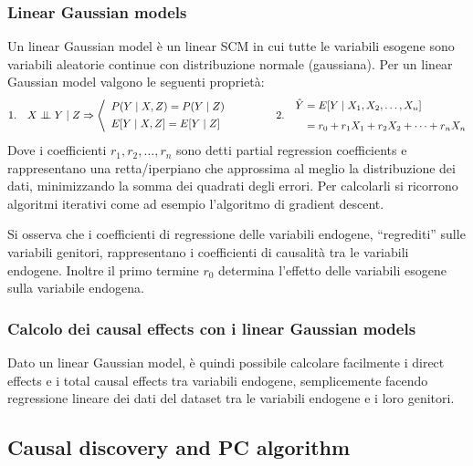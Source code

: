\subsubsection*{Linear Gaussian models}
Un linear Gaussian model è un linear SCM in cui tutte le variabili esogene sono variabili aleatorie continue con distribuzione
normale (gaussiana). Per un linear Gaussian model valgono le seguenti proprietà:
\[1. \quad X \perp \!\!\! \perp Y \mid Z  \Rightarrow \left< \begin{array}{l}
	P(Y \mid X, Z) = P(Y \mid Z) \\[4pt]
	E[Y \mid X, Z] = E[Y \mid Z]
\end{array} \right. \qquad\qquad 2. \quad \begin{aligned}
	\hat{Y} &= E[Y \mid X_1, X_2, \dots, X_n] \\[4pt]
	&= r_0 + r_1 X_1 + r_2 X_2 + \dots + r_n X_n
\end{aligned}\]
Dove i coefficienti \(r_1, r_2, \dots, r_n\) sono detti partial regression coefficients e rappresentano una retta/iperpiano
che approssima al meglio la distribuzione dei dati, minimizzando la somma dei quadrati degli errori. Per calcolarli si
ricorrono algoritmi iterativi come ad esempio l'algoritmo di gradient descent.

Si osserva che i coefficienti di regressione delle variabili endogene, ``regrediti'' sulle variabili genitori, rappresentano
i coefficienti di causalità tra le variabili endogene. Inoltre il primo termine \(r_0\) determina l'effetto delle variabili
esogene sulla variabile endogena.

\subsubsection*{Calcolo dei causal effects con i linear Gaussian models}
Dato un linear Gaussian model, è quindi possibile calcolare facilmente i direct effects e i total causal effects tra variabili
endogene, semplicemente facendo regressione lineare dei dati del dataset tra le variabili endogene e i loro genitori. 

\subsection{Causal discovery and PC algorithm}
